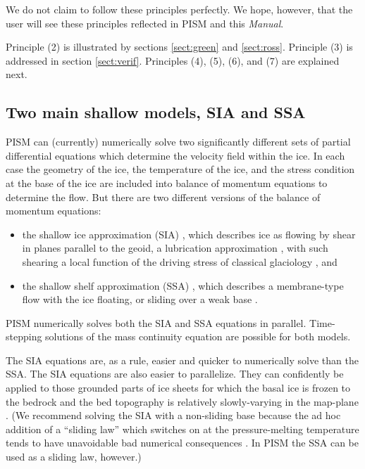 \documentclass[11pt,final]{amsart}
\begin{document}
\noindent We do not claim to follow these principles perfectly.  We hope, however, that the user will see these principles reflected in PISM and this \emph{Manual}.

Principle (2) is illustrated by sections \ref{sect:green} and \ref{sect:ross}.  Principle (3) is addressed in section \ref{sect:verif}.  Principles (4), (5), (6), and (7) are explained next.


\subsection{Two main shallow models, SIA and SSA}  PISM can (currently) numerically solve two significantly different sets of partial differential equations which determine the velocity field within the ice.  In each case the geometry of the ice, the temperature of the ice, and the stress condition at the base of the ice are included into balance of momentum equations to determine the flow.  But there are two different versions of the balance of momentum equations:\begin{itemize}
\item the shallow ice approximation (SIA) \cite{Hutter}, which describes ice as flowing by shear in planes parallel to the geoid, a lubrication approximation \cite{Fowler}, with such shearing a local function of the driving stress of classical glaciology \cite{Paterson}, and
\item the shallow shelf approximation (SSA) \cite{WeisGreveHutter}, which describes a membrane-type flow with the ice floating, or sliding over a weak base \cite{Morland,MacAyeal,SchoofStream}.
\end{itemize}
PISM numerically solves both the SIA and SSA equations in parallel.  Time-stepping solutions of the mass continuity equation are possible for both models.

The SIA equations are, as a rule, easier and quicker to numerically solve than the SSA.  The SIA equations are also easier to parallelize.  They can confidently be applied to those grounded parts of ice sheets for which the basal ice is frozen to the bedrock and the bed topography is relatively slowly-varying in the map-plane \cite{Fowler}.  (We recommend solving the SIA with a non-sliding base because the ad hoc addition of a ``sliding law'' which switches on at the pressure-melting temperature tends to have unavoidable bad numerical consequences \cite[appendix B]{BBssasliding}.  In PISM the SSA can be used as a sliding law, however.)
\end{document}
